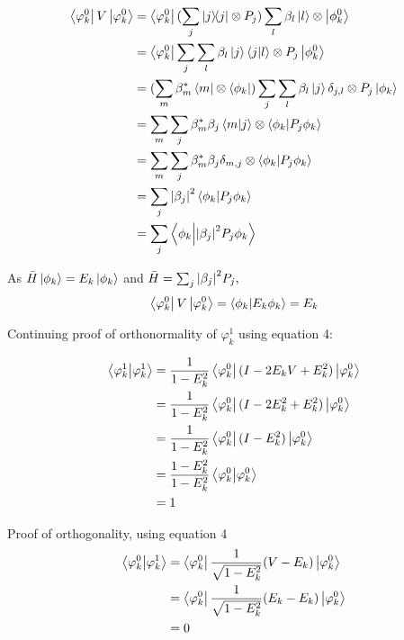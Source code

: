 \begin{align*}
\left\langle{\varphi_k^0}\right\vert V \left\vert{\varphi_k^0}\right\rangle &= \left\langle{\varphi_k^0}\right\vert (\sum_j | j \rangle\!\langle j | \otimes P_j) \sum_l \beta_l \left\vert{l}\right\rangle \otimes \left\vert{\phi_k^0}\right\rangle\\
&= \left\langle{\varphi_k^0}\right\vert\sum_j \sum_l \beta_l \left\vert{j}\right\rangle \braket{j}{l} \otimes P_j \left\vert{\phi_k^0}\right\rangle\\
&=(\sum_m \beta_m^* \left\langle{m}\right\vert \otimes \left\langle{\phi_k}\right\vert) \sum_j \sum_l \beta_l \left\vert{j}\right\rangle \delta_{j,l} \otimes P_j \left\vert{\phi_k}\right\rangle\\
&= \sum_m \sum_j \beta_m^* \beta_j \braket{m}{j} \otimes \braket{\phi_k}{P_j \phi_k}\\
&= \sum_m \sum_j \beta_m^* \beta_j \delta_{m,j} \otimes \braket{\phi_k}{P_j \phi_k}\\
&= \sum_j \abs{\beta_j}^2 \braket{\phi_k}{P_j \phi_k}\\
&= \sum_j \braket{\phi_k}{ \abs{\beta_j}^2  P_j \phi_k}
\end{align*}

As $\bar{H}\left\vert{\phi_k}\right\rangle = E_k\left\vert{\phi_k}\right\rangle$ and $\bar{H} = \sum_j \abs{\beta_j}^2  P_j,$
\begin{equation}
\left\langle{\varphi_k^0}\right\vert V \left\vert{\varphi_k^0}\right\rangle = \braket{\phi_k}{E_k \phi_k}
= E_k
\end{equation}

Continuing proof of orthonormality of $\varphi_k^1$ using equation 4:



\begin{align*}
\braket{\varphi_k^1}{\varphi_k^1} &= \frac{1}{1 - E^2_k} \left\langle{\varphi_k^0}\right\vert (I - 2 E_kV + E_k^2) \left\vert{\varphi_k^0}\right\rangle\\
&= \frac{1}{1 - E^2_k} \left\langle{\varphi_k^0}\right\vert (I - 2 E_k^2 + E_k^2) \left\vert{\varphi_k^0}\right\rangle\\
&= \frac{1}{1 - E^2_k} \left\langle{\varphi_k^0}\right\vert (I -  E_k^2) \left\vert{\varphi_k^0}\right\rangle\\
&= \frac{1- E^2_k}{1 - E^2_k} \braket{\varphi_k^0}{\varphi_k^0}\\
&= 1
\end{align*}

Proof of orthogonality, using equation 4
\begin{align*}
\braket{\varphi_k^0}{\varphi_k^1} &= \left\langle{\varphi_k^0}\right\vert  \frac{1}{\sqrt{1 - E^2_k}}(V-E_k) \left\vert{\varphi_k^0}\right\rangle\\
&= \left\langle{\varphi_k^0}\right\vert  \frac{1}{\sqrt{1 - E^2_k}}(E_k-E_k) \left\vert{\varphi_k^0}\right\rangle\\
&= 0
\end{align*}


